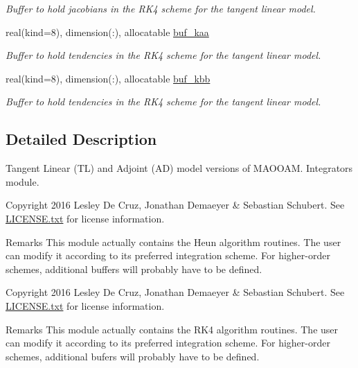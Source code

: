 \begin{DoxyCompactItemize}
\begin{DoxyCompactList}\small\item\em Buffer to hold jacobians in the R\+K4 scheme for the tangent linear model. \end{DoxyCompactList}\item 
real(kind=8), dimension(\+:), allocatable \hyperlink{namespacetl__ad__integrator_a24b147c589eb6bdb6175c56657aff5ae}{buf\+\_\+kaa}
\begin{DoxyCompactList}\small\item\em Buffer to hold tendencies in the R\+K4 scheme for the tangent linear model. \end{DoxyCompactList}\item 
real(kind=8), dimension(\+:), allocatable \hyperlink{namespacetl__ad__integrator_a68ad95731421a7e0c9f37668631e279c}{buf\+\_\+kbb}
\begin{DoxyCompactList}\small\item\em Buffer to hold tendencies in the R\+K4 scheme for the tangent linear model. \end{DoxyCompactList}\end{DoxyCompactItemize}


\subsection{Detailed Description}
Tangent Linear (TL) and Adjoint (AD) model versions of M\+A\+O\+O\+AM. Integrators module. 

\begin{DoxyCopyright}{Copyright}
2016 Lesley De Cruz, Jonathan Demaeyer \& Sebastian Schubert. See \hyperlink{LICENSE_8txt}{L\+I\+C\+E\+N\+S\+E.\+txt} for license information. 
\end{DoxyCopyright}
\begin{DoxyRemark}{Remarks}
This module actually contains the Heun algorithm routines. The user can modify it according to its preferred integration scheme. For higher-\/order schemes, additional buffers will probably have to be defined.
\end{DoxyRemark}
\begin{DoxyCopyright}{Copyright}
2016 Lesley De Cruz, Jonathan Demaeyer \& Sebastian Schubert. See \hyperlink{LICENSE_8txt}{L\+I\+C\+E\+N\+S\+E.\+txt} for license information. 
\end{DoxyCopyright}
\begin{DoxyRemark}{Remarks}
This module actually contains the R\+K4 algorithm routines. The user can modify it according to its preferred integration scheme. For higher-\/order schemes, additional bufers will probably have to be defined. 
\end{DoxyRemark}


